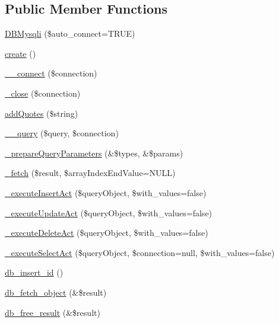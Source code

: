 \subsection*{Public Member Functions}
\begin{DoxyCompactItemize}
\item 
\hyperlink{classDBMysqli_ab3cb2172fa087e11c06968914090b71d}{D\+B\+Mysqli} (\$auto\+\_\+connect=T\+R\+UE)
\item 
\hyperlink{classDBMysqli_a589dd45054eb50e666c3a57815631111}{create} ()
\item 
\hyperlink{classDBMysqli_a7c041395f7926e0ec84186aa9eabc138}{\+\_\+\+\_\+connect} (\$connection)
\item 
\hyperlink{classDBMysqli_afd6324d65eaf95dbd8e6fa2f97b9b9db}{\+\_\+close} (\$connection)
\item 
\hyperlink{classDBMysqli_a29266a97d63be11763eb24926d39f544}{add\+Quotes} (\$string)
\item 
\hyperlink{classDBMysqli_aa7e47178c283abd8ba1bb7c8d0a31c66}{\+\_\+\+\_\+query} (\$query, \$connection)
\item 
\hyperlink{classDBMysqli_ab884208e90c71708faca2e56c5da0666}{\+\_\+prepare\+Query\+Parameters} (\&\$types, \&\$params)
\item 
\hyperlink{classDBMysqli_a4b5becb1ab24b99a184fe1942bc73280}{\+\_\+fetch} (\$result, \$array\+Index\+End\+Value=N\+U\+LL)
\item 
\hyperlink{classDBMysqli_a6a62a12cd9c46aac0242e81f58a25803}{\+\_\+execute\+Insert\+Act} (\$query\+Object, \$with\+\_\+values=false)
\item 
\hyperlink{classDBMysqli_acc5f5408c3717c88411a238e1e176785}{\+\_\+execute\+Update\+Act} (\$query\+Object, \$with\+\_\+values=false)
\item 
\hyperlink{classDBMysqli_a3dc572c5b452c7a2e0e150f6b8af622e}{\+\_\+execute\+Delete\+Act} (\$query\+Object, \$with\+\_\+values=false)
\item 
\hyperlink{classDBMysqli_a76e3f67b339c7613ad1d6e33af04e51e}{\+\_\+execute\+Select\+Act} (\$query\+Object, \$connection=null, \$with\+\_\+values=false)
\item 
\hyperlink{classDBMysqli_a080939c13758f00ecd0092eda6cd2452}{db\+\_\+insert\+\_\+id} ()
\item 
\hyperlink{classDBMysqli_a9e173fea0afa5c419977be95d1859892}{db\+\_\+fetch\+\_\+object} (\&\$result)
\item 
\hyperlink{classDBMysqli_a8639ebaca8bae119797a084af68750cc}{db\+\_\+free\+\_\+result} (\&\$result)
\end{DoxyCompactItemize}
